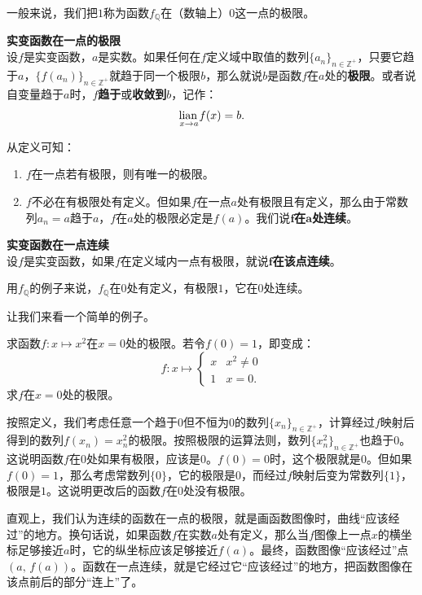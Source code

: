 \documentclass[12pt,UTF8]{ctexbook}
\begin{document}
一般来说，我们把$1$称为函数$f_{\mathbb{Q}}$在（数轴上）$0$这一点的极限。
\begin{df}\textbf{实变函数在一点的极限}
    \mbox{}\\
    设$f$是实变函数，$a$是实数。如果任何在$f$定义域中取值的数列$\{a_n\}_{n\in\mathbb{Z}^+}$，只要它趋于$a$，$\{f(a_n)\}_{n\in\mathbb{Z}^+}$就趋于同一个极限$b$，那么就说$b$是函数$f$在$a$处的\textbf{极限}。或者说自变量趋于$a$时，$f$\textbf{趋于}或\textbf{收敛到}$b$，记作：
    $$  \underset{x \to a}{\operatorname{lian}\,} f(x) = b. $$
\end{df}
从定义可知：
\begin{enumerate}
    \item $f$在一点若有极限，则有唯一的极限。
    \item $f$不必在有极限处有定义。但如果$f$在一点$a$处有极限且有定义，那么由于常数列$a_n = a$趋于$a$，$f$在$a$处的极限必定是$f(a)$。我们说$\boldsymbol{f}$\textbf{在}$\boldsymbol{a}$\textbf{处连续}。
\end{enumerate}
\begin{df}{\textbf{实变函数在一点连续}}
    \mbox{}\\
    设$f$是实变函数，如果$f$在定义域内一点有极限，就说$\boldsymbol{f}$\textbf{在该点连续}。
\end{df}
用$f_{\mathbb{Q}}$的例子来说，$f_{\mathbb{Q}}$在$0$处有定义，有极限$1$，它在$0$处连续。

让我们来看一个简单的例子。
\begin{et}
    求函数$f: x\mapsto x^2$在$x=0$处的极限。若令$f(0) = 1$，即变成：
    $$f:x\mapsto \begin{cases}
    x & x^2 \neq 0 \\
    1 & x = 0.
    \end{cases}$$
    求$f$在$x=0$处的极限。
\end{et}
\begin{so}
    按照定义，我们考虑任意一个趋于$0$但不恒为$0$的数列$\{x_n\}_{n\in\mathbb{Z}^+}$，计算经过$f$映射后得到的数列$f(x_n) = x_n^2$的极限。按照极限的运算法则，数列$\{x_n^2\}_{n\in\mathbb{Z}^+}$也趋于$0$。这说明函数$f$在$0$处如果有极限，应该是$0$。$f(0)=0$时，这个极限就是$0$。但如果$f(0)=1$，那么考虑常数列$\{0\}$，它的极限是$0$，而经过$f$映射后变为常数列$\{1\}$，极限是$1$。这说明更改后的函数$f$在$0$处没有极限。
\end{so}

直观上，我们认为连续的函数在一点的极限，就是画函数图像时，曲线“应该经过”的地方。换句话说，如果函数$f$在实数$a$处有定义，那么当$f$图像上一点$x$的横坐标足够接近$a$时，它的纵坐标应该足够接近$f(a)$。最终，函数图像“应该经过”点$(a,\,f(a))$。函数在一点连续，就是它经过它“应该经过”的地方，把函数图像在该点前后的部分“连上”了。
\end{document}
